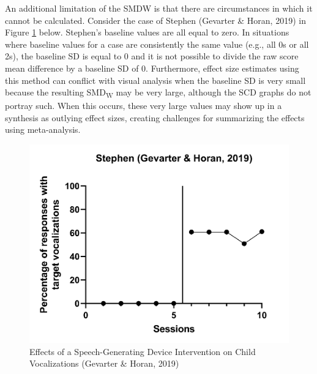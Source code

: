 \documentclass[
]{book}
\begin{document}
An additional limitation of the SMDW is that there are circumstances in which it cannot be calculated. Consider the case of Stephen (Gevarter \& Horan, 2019) in Figure \ref{fig:GevarterHoran-2019} below. Stephen's baseline values are all equal to zero. In situations where baseline values for a case are consistently the same value (e.g., all 0s or all 2s), the baseline SD is equal to 0 and it is not possible to divide the raw score mean difference by a baseline SD of 0. Furthermore, effect size estimates using this method can conflict with visual analysis when the baseline SD is very small because the resulting SMD\textsubscript{W} may be very large, although the SCD graphs do not portray such. When this occurs, these very large values may show up in a synthesis as outlying effect sizes, creating challenges for summarizing the effects using meta-analysis.

\begin{figure}
\includegraphics[width=1\linewidth]{images/raw_GevarterHoran2019} \caption{Effects of a Speech-Generating Device Intervention on Child Vocalizations (Gevarter \& Horan, 2019)}\label{fig:GevarterHoran-2019}
\end{figure}
\end{document}
